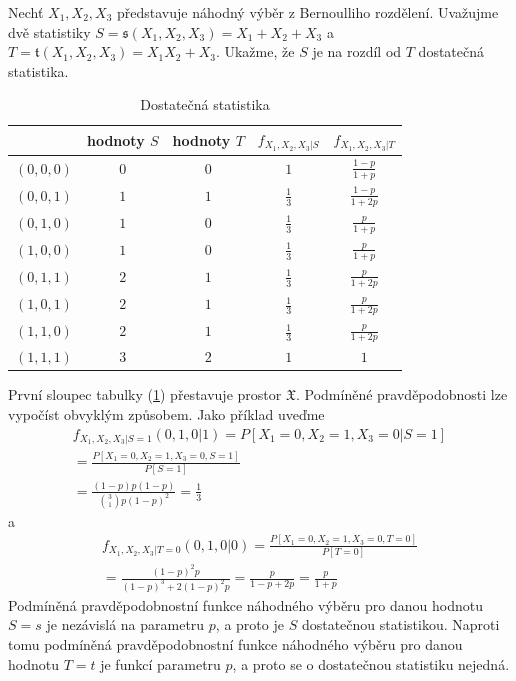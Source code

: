 \begin{example}
Nechť $X_1, X_2, X_3$ představuje náhodný výběr z Bernoulliho rozdělení. Uvažujme dvě statistiky $S = \mathfrak{s}(X_1, X_2, X_3) = X_1 + X_2 + X_3$ a $T = \mathfrak{t}(X_1, X_2, X_3) = X_1X_2 + X_3$. Ukažme, že $S$ je na rozdíl od $T$ dostatečná statistika.
\begin{table}
\begin{center}
\begin{tabular}{| c | c | c | c | c |}
\hline
 & hodnoty $S$ & hodnoty $T$ & $f_{X_1, X_2, X_3|S}$ & $f_{X_1, X_2, X_3|T}$\\
\hline
$(0,0,0)$ & $0$ & $0$ & $1$ & $\frac{1 - p}{1 + p}$\\
\hline
$(0,0,1)$ & $1$ & $1$ & $\frac{1}{3}$ & $\frac{1 - p}{1 + 2p}$\\
\hline
$(0,1,0)$ & $1$ & $0$ & $\frac{1}{3}$ & $\frac{p}{1 + p}$\\
\hline
$(1,0,0)$ & $1$ & $0$ & $\frac{1}{3}$ & $\frac{p}{1 + p}$\\
\hline
$(0,1,1)$ & $2$ & $1$ & $\frac{1}{3}$ & $\frac{p}{1 + 2p}$\\
\hline
$(1,0,1)$ & $2$ & $1$ & $\frac{1}{3}$ & $\frac{p}{1 + 2p}$\\
\hline
$(1,1,0)$ & $2$ & $1$ & $\frac{1}{3}$ & $\frac{p}{1 + 2p}$\\
\hline
$(1,1,1)$ & $3$ & $2$ & $1$ & $1$\\
\hline
\end{tabular}
\caption{Dostatečná statistika}
\label{sufficient-statistics}
\end{center}
\end{table}

První sloupec tabulky (\ref{sufficient-statistics}) přestavuje prostor $\mathfrak{X}$. Podmíněné pravděpodobnosti lze vypočíst obvyklým způsobem. Jako příklad uveďme
\begin{gather*}
f_{X_1, X_2, X_3|S = 1}(0,1,0|1) = P[X_1 = 0, X_2 = 1, X_3 = 0 | S = 1]\\
= \frac{P[X_1 = 0, X_2 = 1, X_3 = 0, S = 1]}{P[S = 1]}\\
= \frac{(1 - p)p(1 - p)}{\binom{3}{1}p(1 - p)^2} = \frac{1}{3}
\end{gather*}
a
\begin{gather*}
f_{X_1, X_2, X_3|T = 0}(0, 1, 0 | 0) = \frac{P[X_1 = 0, X_2 = 1, X_3 = 0, T = 0]}{P[T = 0]}\\
= \frac{(1 - p)^2 p}{(1 - p)^3 + 2(1 - p)^2 p} = \frac{p}{1 - p + 2p} = \frac{p}{1 + p}
\end{gather*}
Podmíněná pravděpodobnostní funkce náhodného výběru pro danou hodnotu $S = s$ je nezávislá na parametru $p$, a proto je $S$ dostatečnou statistikou. Naproti tomu podmíněná pravděpodobnostní funkce náhodného výběru pro danou hodnotu $T = t$ je funkcí parametru $p$, a proto se o dostatečnou statistiku nejedná.


\end{example}
